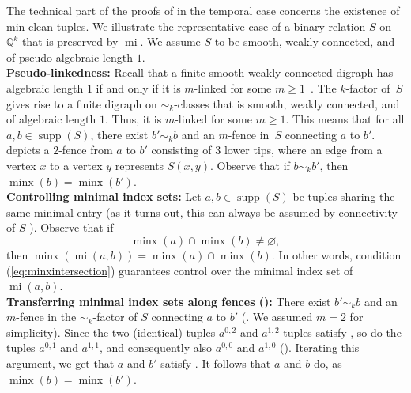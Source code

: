 \documentclass[a4paper,reqno, cleveref]{amsart}
\newcommand{\Q}{\mathbb{Q}}
\DeclareMathOperator{\supp}{supp}
\DeclareMathOperator{\mi}{mi}
\DeclareMathOperator{\minx}{minx}
\newcommand{\johanna}[1]{\todo{\textbf{Johanna:} #1}}
\newcommand{\moritz}[1]{\todo{\textbf{Moritz:} #1}}
\begin{document}
The technical part of the proofs of  in the temporal case concerns the existence of min-clean tuples. %
We illustrate the representative case of a binary relation $S$ on $\Q^k$ that is preserved by $\mi$. %
We assume  $S$ to be smooth, weakly connected, and of pseudo-algebraic length $1$. \\


\textbf{Pseudo-linkedness:}
Recall that a finite smooth weakly connected digraph has algebraic length $1$ if and only if it is $m$-linked for some $m\geq 1$~\cite[Claim~3.8]{Cyclic}.  The $k$-factor of~$S$ gives rise to a finite digraph on $\sim_k$-classes that is smooth, weakly connected, and of algebraic length $1$. Thus, it is $m$-linked for some $m\geq 1$. This means that for all $a,b \in \supp(S)$, there exist $b' \sim_k b$ and an $m$-fence in~$S$ connecting $a$ to $b'$.  depicts a $2$-fence 
 from $a$ to $b'$ consisting of $3$ lower tips, where an edge from a vertex $x$ to a vertex $y$ represents $S(x,y)$.  Observe that if $b\sim_k b'$, then $\minx(b)=\minx(b')$. \\


\textbf{Controlling minimal index sets:}
Let $a,b \in \supp(S)$ be tuples sharing the same minimal entry (as it turns out, this can always be assumed by connectivity of $S$%
). 
Observe that if 
\begin{equation}\label{eq:minxintersection}
    \minx(a)\cap \minx(b)\neq \varnothing,
\end{equation}
then $\minx(\mi(a,b))=\minx(a)\cap \minx(b)$. In other words, condition (\ref{eq:minxintersection}) guarantees control over the minimal index set of $\mi(a,b)$. \\


\textbf{Transferring minimal index sets along fences ():} There exist $b'\sim_k b$ and an $m$-fence in the $\sim_k$-factor of $S$ connecting $a$ to $b'$ (. We assumed $m=2$ for simplicity). Since the two (identical) tuples $a^{0,2}$ and $a^{1,2}$ tuples satisfy , so do the tuples $a^{0,1}$ and $a^{1,1}$, and consequently also $a^{0,0}$ and $a^{1,0}$ (). Iterating this argument, we get that $a$ and $b'$ satisfy . It follows that $a$ and $b$ do, as $\minx(b)=\minx(b')$. \\
\end{document}
